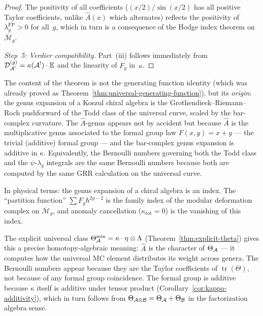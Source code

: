 \begin{proof}
The positivity of all coefficients
($(x/2)/\sin(x/2)$ has all positive Taylor coefficients,
unlike $\hat{A}(x)$ which alternates) reflects the positivity
of $\lambda_g^{\mathrm{FP}} > 0$ for all~$g$, which in turn
is a consequence of the Hodge index theorem on
$\overline{\mathcal{M}}_g$.

\emph{Step~5: Verdier compatibility.}
Part~(iii) follows immediately from
$\mathcal{D}_{\mathcal{A}^!}^{(g)} = \kappa(\mathcal{A}^!) \cdot \mathbb{E}$
and the linearity of $F_g$ in~$\kappa$.
\end{proof}

\begin{remark}\label{rem:family-index-punchline}
The content of the theorem is not the generating function identity
(which was already proved as
Theorem~\ref{thm:universal-generating-function}),
but its \emph{origin}: the genus expansion of a Koszul chiral
algebra is the Grothendieck--Riemann--Roch pushforward of the
Todd class of the universal curve, scaled by the bar-complex
curvature.  The $\hat{A}$-genus appears not by accident but because
$\hat{A}$ is the multiplicative genus associated to the formal
group law $F(x,y) = x + y$ --- the trivial (additive) formal
group --- and the bar-complex genus expansion is additive in
$\kappa$.  Equivalently, the Bernoulli numbers governing both the
Todd class and the $\psi$-$\lambda_g$ integrals are the same
Bernoulli numbers because both are computed by the same GRR
calculation on the universal curve.

In physical terms: the genus expansion of a chiral algebra is
an index.  The ``partition function'' $\sum F_g \hbar^{2g-2}$
is the family index of the modular deformation complex on
$\overline{\mathcal{M}}_g$, and anomaly cancellation
($\kappa_{\mathrm{tot}} = 0$) is the vanishing of this index.

The explicit universal class
$\Theta_{\mathcal{A}}^{\min} = \kappa \cdot \eta \otimes \Lambda$
(Theorem~\ref{thm:explicit-theta}) gives this a precise
homotopy-algebraic meaning: $\hat{A}$ is the character of
$\Theta_{\mathcal{A}}$ --- it computes how the universal MC element
distributes its weight across genera.  The Bernoulli numbers
appear because they are the Taylor coefficients of
$\operatorname{tr}(\Theta)$, not because of any formal group
coincidence.  The formal group is additive because $\kappa$
itself is additive under tensor product
(Corollary~\ref{cor:kappa-additivity}), which in turn follows
from $\Theta_{\mathcal{A} \otimes \mathcal{B}} = \Theta_{\mathcal{A}} + \Theta_{\mathcal{B}}$
in the factorization algebra sense.
\end{remark}

